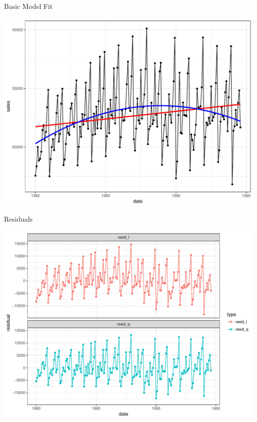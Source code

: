 \documentclass[11pt,ignorenonframetext,]{beamer}
\begin{document}
\begin{frame}{Basic Model Fit}

\includegraphics{Lec6_files/figure-beamer/unnamed-chunk-11-1.pdf}

\end{frame}

\begin{frame}{Residuals}

\includegraphics{Lec6_files/figure-beamer/unnamed-chunk-12-1.pdf}

\end{frame}
\end{document}
